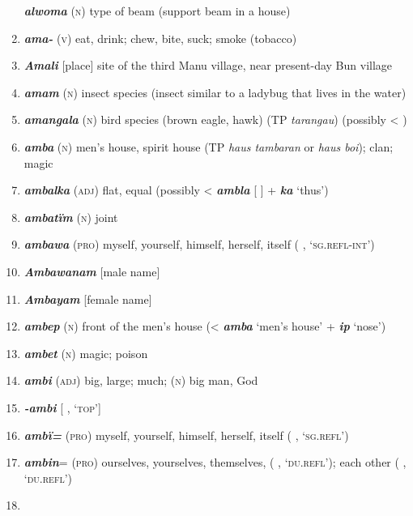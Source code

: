 \begin{enumerate}[noitemsep, label={}, align=left, widest=190, labelsep=1ex,leftmargin=*,itemindent=-10pt]
\textbf{\textit{alwoma}} (\textsc{n}) type of beam (support beam in a house) \item 
\textbf{\textit{ama-}} (\textsc{v}) eat, drink; chew, bite, suck; smoke (tobacco) \item 
\textbf{\textit{Amali}} [place] site of the third Manu village, near present-day Bun village \item 
\textbf{\textit{amam}} (\textsc{n}) insect species (insect similar to a ladybug that lives in the water) \item 
\textbf{\textit{amangala}} (\textsc{n}) bird species (brown eagle, hawk) (TP \textit{tarangau}) (possibly \linebreak < ) \item 
\textbf{\textit{amba}} (\textsc{n}) men’s house, spirit house (TP \textit{haus tambaran} or \textit{haus boi}); clan; magic \item 
\textbf{\textit{ambalka}} (\textsc{adj}) flat, equal (possibly < \textbf{\textit{ambla}} [  ] + \textbf{\textit{ka}} ‘thus’) \item 
\textbf{\textit{ambatïm}} (\textsc{n}) joint \item 
\textbf{\textit{ambawa}} (\textsc{pro}) myself, yourself, himself, herself, itself (  \linebreak {} , ‘\textsc{sg.refl-int}’) \item 
\textbf{\textit{Ambawanam}} [male name] \item 
\textbf{\textit{Ambayam}} [female name] \item 
\textbf{\textit{ambep}} (\textsc{n}) front of the men’s house (< \textbf{\textit{amba}} ‘men’s house’ + \textbf{\textit{ip}} ‘nose’) \item 
\textbf{\textit{ambet}} (\textsc{n}) magic; poison \item 
\textbf{\textit{ambi}} (\textsc{adj}) big, large; much; (\textsc{n}) big man, God \item 
\textbf{\textit{-ambi}} [ , ‘\textsc{top}’] \item 
\textbf{\textit{ambï=}} (\textsc{pro}) myself, yourself, himself, herself, itself (  , ‘\textsc{sg.refl}’) \item 
\textbf{\textit{ambin}}= (\textsc{pro}) ourselves, yourselves, themselves, (  , \linebreak ‘\textsc{du.refl}’); each other (  , ‘\textsc{du.refl}’) \item 

\end{enumerate}
